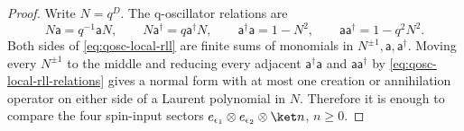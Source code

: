 \begin{proof}
Write \(N=q^D\).  The q-oscillator relations are
\begin{equation}
  N\mathsf a=q^{-1}\mathsf aN,\qquad
  N\mathsf a^\dagger=q\mathsf a^\dagger N,\qquad
  \mathsf a^\dagger\mathsf a=1-N^2,\qquad
  \mathsf a\mathsf a^\dagger=1-q^2N^2 .
  \label{eq:qosc-local-rll-relations}
\end{equation}
Both sides of \eqref{eq:qosc-local-rll} are finite sums of monomials in
\(N^{\pm1},\mathsf a,\mathsf a^\dagger\).  Moving every \(N^{\pm1}\)
to the middle and reducing every adjacent
\(\mathsf a^\dagger\mathsf a\) and
\(\mathsf a\mathsf a^\dagger\) by
\eqref{eq:qosc-local-rll-relations} gives a normal form with at most one
creation or annihilation operator on either side of a Laurent polynomial in
\(N\).  Therefore it is enough to compare the four spin-input sectors
\(e_{\epsilon_1}\otimes e_{\epsilon_2}\otimes\ket n\), \(n\ge0\).


\end{proof}
